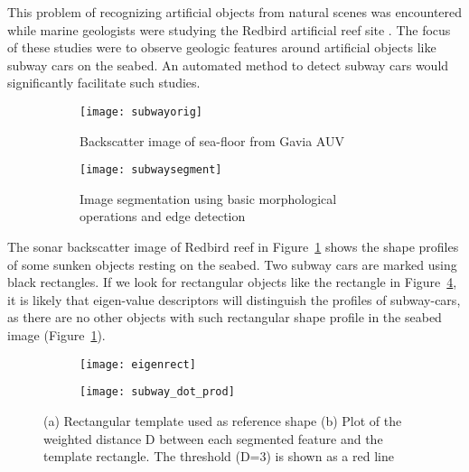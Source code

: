 This problem of recognizing artificial objects from natural scenes was encountered while marine geologists were studying the Redbird artificial reef site \cite{redbird_nicole, redbird_art}. The focus of these studies were to observe geologic features around artificial objects like subway cars on the seabed. An automated method to detect subway cars would significantly facilitate such studies. 

\begin{figure}
  \begin{subfigure}[]{0.9\textwidth}
      \texttt{[image: subwayorig]}
      \caption{Backscatter image of sea-floor from Gavia AUV}
      \label{subfig:subwayorig}
  \end{subfigure}
  \begin{subfigure}[]{0.9\textwidth}
      \texttt{[image: subwaysegment]}
      \caption{Image segmentation using basic morphological operations and edge detection}
      \label{subfig:subwaysegment}
  \end{subfigure}
\caption[Analysis of sonar backscatter image of Redbird reef]{}
\end{figure}

The sonar backscatter image of Redbird reef in Figure~\ref{subfig:subwayorig} shows the shape profiles of some sunken objects resting on the seabed. Two subway cars are marked using black rectangles. If we look for rectangular objects like the rectangle in Figure~\ref{subfig:subwayrect}, it is likely that eigen-value descriptors will distinguish the profiles of subway-cars, as there are no other objects with such rectangular shape profile in the seabed image (Figure~\ref{subfig:subwayorig}). 

\begin{figure}
\centering
  \begin{subfigure}[]{0.3\textwidth}
      \texttt{[image: eigenrect]}
      \caption{}
      \label{subfig:subwayrect}
  \end{subfigure}
  \begin{subfigure}[]{0.4\textwidth}
      \texttt{[image: subway\_dot\_prod]}
      \caption{}
      \label{subfig:eigendistances}
  \end{subfigure}
\caption[Plot of similarity measures of different underwater objects to the subway car reference profile]{(a) Rectangular template used as reference shape (b) Plot of the weighted distance D between each segmented feature and the template rectangle. The threshold (D=3) is shown as a red line}
\end{figure}


